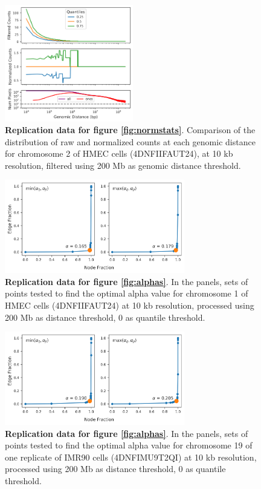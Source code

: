 \begin{figure}[h]
  \centering
  \includegraphics[width=0.5\textwidth]{normalization_rep2.png}
  \caption{\textbf{Replication data for figure \ref{fig:normstats}}. Comparison of the distribution of raw and normalized counts at each genomic distance for chromosome 2 of HMEC cells (4DNFIIFAUT24), at 10 kb resolution, filtered using 200 Mb as genomic distance threshold.} 
\end{figure}

\begin{figure}[h]
  \centering 
  \includegraphics[width=0.7\textwidth]{alphas_rep1.png}
  \caption{\textbf{Replication data for figure \ref{fig:alphas}}. In the panels, sets of points tested to find the optimal alpha value for chromosome 1 of HMEC cells (4DNFIIFAUT24) at 10 kb resolution, processed using 200 Mb as distance threshold, 0 as quantile threshold.}
\end{figure}

\begin{figure}[h]
  \centering 
  \includegraphics[width=0.7\textwidth]{alphas_rep3.png}
  \caption{\textbf{Replication data for figure \ref{fig:alphas}}. In the panels, sets of points tested to find the optimal alpha value for chromosome 19 of one replicate of IMR90 cells (4DNFIMU9T2QI) at 10 kb resolution, processed using 200 Mb as distance threshold, 0 as quantile threshold.}
\end{figure}

